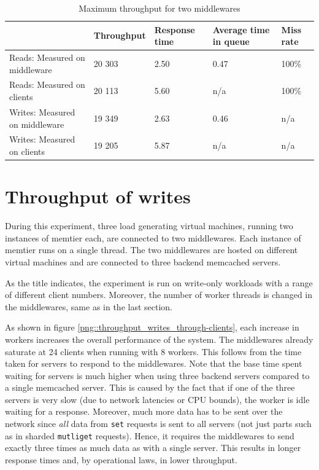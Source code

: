 \documentclass[11pt,a4paper]{article}
\begin{document}
\begin{table}[!h]
    \centering
    \begin{tabular}{|l|p{2cm}|p{2cm}|p{2cm}|p{2cm}|}
        \hline                                & Throughput & Response time & Average time in queue & Miss rate \\
        \hline Reads: Measured on middleware  &     20 303 &          2.50 &                  0.47 &     100\% \\
        \hline Reads: Measured on clients     &     20 113 &          5.60 & n/a                   &     100\% \\
        \hline Writes: Measured on middleware &     19 349 &          2.63 &                  0.46 & n/a       \\
        \hline Writes: Measured on clients    &     19 205 &          5.87 & n/a                   & n/a       \\
        \hline
    \end{tabular}
    \caption{Maximum throughput for two middlewares}
    \label{table::max_through_section_3_2mw}
\end{table}

\newpage

\section{Throughput of writes \label{section::queue_model}}
During this experiment, three load generating virtual machines, running two instances of memtier each, are connected to two middlewares. Each instance of memtier runs on a single thread. The two middlewares are hosted on different virtual machines and are connected to three backend memcached servers.

As the title indicates, the experiment is run on write-only workloads with a range of different client numbers. Moreover, the number of worker threads is changed in the middlewares, same as in the last section.

As shown in figure \ref{png::throughput_writes_through-clients}, each increase in workers increases the overall performance of the system. The middlewares already saturate at 24 clients when running with 8 workers. This follows from the time taken for servers to respond to the middlewares. Note that the base time spent waiting for servers is much higher when using three backend servers compared to a single memcached server. This is caused by the fact that if one of the three servers is very slow (due to network latencies or CPU bounds), the worker is idle waiting for a response. Moreover, much more data has to be sent over the network since \textit{all} data from \texttt{set} requests is sent to all servers (not just parts such as in sharded \texttt{mutliget} requests). Hence, it requires the middlewares to send exactly three times as much data as with a single server. This results in longer response times and, by operational laws, in lower throughput.
\end{document}
